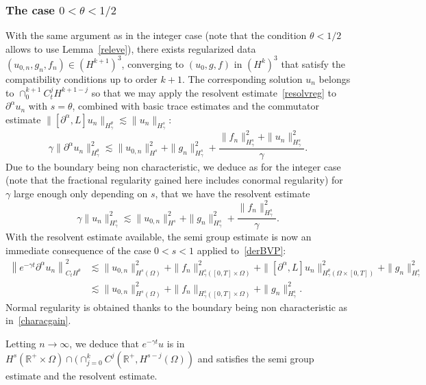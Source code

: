 \documentclass[AHL,Unicode,longabstracts,published]{cedram}
\newcommand{\R}{\mathbb{R}}
\begin{document}
\subsubsection{The case $0<\theta<1/2$}
With the same argument as in the integer case (note that the condition $\theta<1/2$ allows to use Lemma~\ref{releve}), there exists regularized data $(u_{0,n},g_n,f_n)\in (H^{k+1})^3$, converging to $(u_0,g,f)$ in $(H^k)^3$ that satisfy the compatibility conditions up to order $k+1$. The corresponding solution $u_n$ belongs to $\cap_0^{k+1} C_t^jH^{k+1-j}$ so that we may apply the resolvent estimate~\eqref{resolvreg} to $\partial^\alpha u_n$ with $s=\theta$, combined with basic trace estimates and the commutator estimate $\|[\partial^\alpha,L]u_n\|_{H^\theta_\gamma}\lesssim
\|u_n\|_{H^s_\gamma}$:
\begin{equation}\label{keyresolv}
\gamma\|\partial^\alpha u_n\|_{H^\theta_\gamma}^2 \lesssim \|u_{0,n}\|_{H^s}^2+\|g_n\|_{H^s_\gamma}^2 +\frac{\|f_n\|_{H^s_\gamma}^2+
\|u_n\|_{H^s_\gamma}^2}{\gamma}.
\end{equation}
Due to the boundary being non characteristic, we deduce as for the integer case (note that the fractional regularity gained here includes conormal regularity) for $\gamma$ large enough only depending on $s$, that we have the resolvent estimate
\[
\gamma \|u_n\|_{H^s_\gamma}^2
\lesssim \|u_{0,n}\|^2_{H^s}+\|g_n\|_{H^s_\gamma}^2+
\frac{\|f_n\|_{H^s_\gamma }^2}{\gamma}.
\]
With the resolvent estimate available, the semi group estimate is now an immediate consequence of the case $0<s<1$ applied to~\eqref{derBVP}:
\begin{align*}
\left\|e^{-\gamma t} \partial^\alpha u_n\right\|_{C_tH^\theta}^2&\lesssim
\|u_{0,n}\|_{H^s(\Omega)}^2 +\|f_n\|_{H^s_\gamma([0,T]\times \Omega)}^2 +\|[\partial^\alpha,L]u_n\|_{H^\theta_\gamma(\Omega\times [0,T])}^2 +\|g_n\|_{H^s_\gamma}^2
\\
&\lesssim
\|u_{0,n}\|_{H^s(\Omega)}^2 +\|f_n\|_{H^s_\gamma([0,T]\times \Omega)} +\|g_n\|_{H^s_\gamma}^2.
\end{align*}
Normal regularity is obtained thanks to the boundary being non characteristic as in~\eqref{characgain}. 


Letting $n\to \infty$, we deduce that $e^{-\gamma t}u$ is in $H^s(\R^+\times \Omega)\cap (\cap_{j=0}^kC^j(\R^+,H^{s-j}(\Omega))$ and satisfies the semi group estimate and the resolvent estimate.
\end{document}
